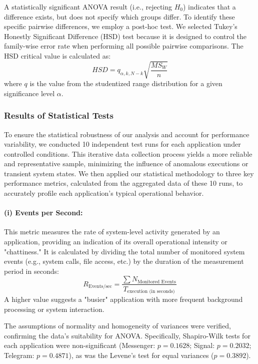\documentclass[a4paper,12pt]{report}
\begin{document}
A statistically significant ANOVA result (i.e., rejecting $H_0$) indicates that a difference exists, but does not specify which groups differ. To identify these specific pairwise differences, we employ a post-hoc test. We selected Tukey's Honestly Significant Difference (HSD) test because it is designed to control the family-wise error rate when performing all possible pairwise comparisons. The HSD critical value is calculated as:
$$
HSD = q_{\alpha, k, N-k} \sqrt{\frac{MS_W}{n}}
$$
where \( q \) is the value from the studentized range distribution for a given significance level \( \alpha \).

\subsubsection{Results of Statistical Tests}

To ensure the statistical robustness of our analysis and account for performance variability, we conducted 10 independent test runs for each application under controlled conditions. This iterative data collection process yields a more reliable and representative sample, minimizing the influence of anomalous executions or transient system states. We then applied our statistical methodology to three key performance metrics, calculated from the aggregated data of these 10 runs, to accurately profile each application's typical operational behavior.
\paragraph{(i) Events per Second:}
This metric measures the rate of system-level activity generated by an application, providing an indication of its overall operational intensity or "chattiness." It is calculated by dividing the total number of monitored system events (e.g., system calls, file access, etc.) by the duration of the measurement period in seconds:
$$
R_{\text{Events/sec}} = \frac{\sum N_{\text{Monitored Events}}}{T_{\text{execution (in seconds)}}}
$$
A higher value suggests a "busier" application with more frequent background processing or system interaction.

The assumptions of normality and homogeneity of variances were verified, confirming the data's suitability for ANOVA. Specifically, Shapiro-Wilk tests for each application were non-significant (Messenger: $p=0.1628$; Signal: $p=0.2032$; Telegram: $p=0.4871$), as was the Levene's test for equal variances ($p=0.3892$).
\end{document}
